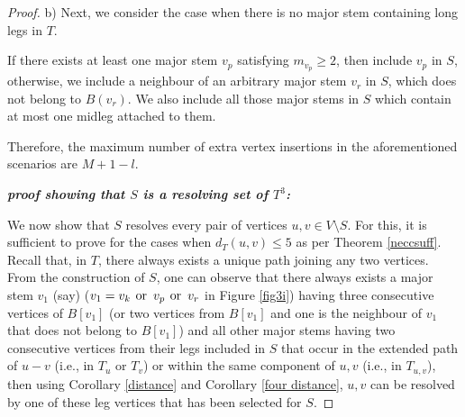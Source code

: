 \documentclass{article}
\theoremstyle{definition}
\numberwithin{equation}{section}
\begin{document}
\begin{proof}
\noindent  b) Next, we consider the case when there is no major stem containing long legs in $T$.
\vspace{0.4em}

If there exists at least one major stem $v_p$ satisfying $m_{v_p}\geq 2$, then include $v_p$ in $S$, otherwise, we include a neighbour of an arbitrary major stem $v_{r}$ in $S$, which does not belong to $B(v_{r})$. We also include all those major stems in $S$ which contain at most one midleg attached to them.


\vspace{0.7em}
\noindent Therefore, the maximum number of extra vertex insertions in the aforementioned scenarios are $M+1-l$.
\vspace{0.6em}

\noindent \textbf{\textit{proof showing that $S$ is a resolving set of $T^{3}$: }} 

\vspace{0.3em}
\noindent We now show that $S$ resolves every pair of vertices $u,v\in V\setminus S$. For this, it is sufficient to prove for the cases when $d_{T}(u,v)\leq 5$ as per Theorem \ref{neccsuff}. Recall that, in $T$, there always exists a unique path joining any two vertices. From the construction of $S$, one can observe that there always exists a major stem $v_{1}$ (say) ($v_{1}=v_{k}\hspace{0.4em}\mbox{or} \hspace{0.5em} v_{p} \hspace{0.4em}\mbox{or} \hspace{0.5em} v_{r}$ in Figure \ref{fig3i}) having three consecutive vertices of $B[v_{1}]$ (or two vertices from $B[v_{1}]$ and one is the neighbour of $v_{1}$ that does not belong to $B[v_{1}]$) and all other major stems having two consecutive vertices from their legs included in $S$ that occur in the extended path of $u-v$ (i.e., in $T_{u}$ or $T_{v}$) or within the same component of $u,v$ (i.e., in $T_{u,v}$), then using Corollary \ref{distance} and Corollary \ref{four distance}, $u,v$ can be resolved by one of these leg vertices that has been selected for $S$. 
\end{proof}

  




\end{document}
